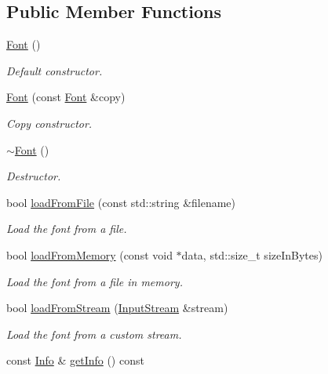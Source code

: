 \subsection*{Public Member Functions}
\begin{DoxyCompactItemize}
\item 
\mbox{\hyperlink{classsf_1_1_font_a506404655b8869ed60d1e7709812f583}{Font}} ()
\begin{DoxyCompactList}\small\item\em Default constructor. \end{DoxyCompactList}\item 
\mbox{\hyperlink{classsf_1_1_font_a72d7322b355ee2f1be4500f530e98081}{Font}} (const \mbox{\hyperlink{classsf_1_1_font}{Font}} \&copy)
\begin{DoxyCompactList}\small\item\em Copy constructor. \end{DoxyCompactList}\item 
\mbox{\hyperlink{classsf_1_1_font_aa18a3c62e6e01e9a21c531b5cad4b7f2}{$\sim$\+Font}} ()
\begin{DoxyCompactList}\small\item\em Destructor. \end{DoxyCompactList}\item 
bool \mbox{\hyperlink{classsf_1_1_font_ab020052ef4e01f6c749a85571c0f3fd1}{load\+From\+File}} (const std\+::string \&filename)
\begin{DoxyCompactList}\small\item\em Load the font from a file. \end{DoxyCompactList}\item 
bool \mbox{\hyperlink{classsf_1_1_font_abf2f8d6de31eb4e1db02e061c323e346}{load\+From\+Memory}} (const void $\ast$data, std\+::size\+\_\+t size\+In\+Bytes)
\begin{DoxyCompactList}\small\item\em Load the font from a file in memory. \end{DoxyCompactList}\item 
bool \mbox{\hyperlink{classsf_1_1_font_abc3f37a354ce8b9a21f8eb93bd9fdafb}{load\+From\+Stream}} (\mbox{\hyperlink{classsf_1_1_input_stream}{Input\+Stream}} \&stream)
\begin{DoxyCompactList}\small\item\em Load the font from a custom stream. \end{DoxyCompactList}\item 
const \mbox{\hyperlink{structsf_1_1_font_1_1_info}{Info}} \& \mbox{\hyperlink{classsf_1_1_font_a7f33b30315f6ce8d8b4acfdabba065f7}{get\+Info}} () const

\end{DoxyCompactItemize}
